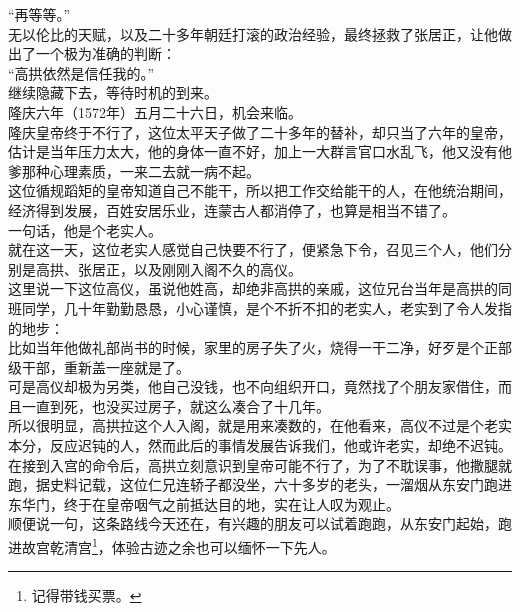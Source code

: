 \begin{multicols}{\theparacolNo}
“再等等。”\\

无以伦比的天赋，以及二十多年朝廷打滚的政治经验，最终拯救了张居正，让他做出了一个极为准确的判断：\\

“高拱依然是信任我的。”\\

继续隐藏下去，等待时机的到来。\\

隆庆六年（1572年）五月二十六日，机会来临。\\

隆庆皇帝终于不行了，这位太平天子做了二十多年的替补，却只当了六年的皇帝，估计是当年压力太大，他的身体一直不好，加上一大群言官口水乱飞，他又没有他爹那种心理素质，一来二去就一病不起。\\

这位循规蹈矩的皇帝知道自己不能干，所以把工作交给能干的人，在他统治期间，经济得到发展，百姓安居乐业，连蒙古人都消停了，也算是相当不错了。\\

一句话，他是个老实人。\\

就在这一天，这位老实人感觉自己快要不行了，便紧急下令，召见三个人，他们分别是高拱、张居正，以及刚刚入阁不久的高仪。\\

这里说一下这位高仪，虽说他姓高，却绝非高拱的亲戚，这位兄台当年是高拱的同班同学，几十年勤勤恳恳，小心谨慎，是个不折不扣的老实人，老实到了令人发指的地步：\\

比如当年他做礼部尚书的时候，家里的房子失了火，烧得一干二净，好歹是个正部级干部，重新盖一座就是了。\\

可是高仪却极为另类，他自己没钱，也不向组织开口，竟然找了个朋友家借住，而且一直到死，也没买过房子，就这么凑合了十几年。\\

所以很明显，高拱拉这个人入阁，就是用来凑数的，在他看来，高仪不过是个老实本分，反应迟钝的人，然而此后的事情发展告诉我们，他或许老实，却绝不迟钝。\\

在接到入宫的命令后，高拱立刻意识到皇帝可能不行了，为了不耽误事，他撒腿就跑，据史料记载，这位仁兄连轿子都没坐，六十多岁的老头，一溜烟从东安门跑进东华门，终于在皇帝咽气之前抵达目的地，实在让人叹为观止。\\

顺便说一句，这条路线今天还在，有兴趣的朋友可以试着跑跑，从东安门起始，跑进故宫乾清宫\footnote{记得带钱买票。}，体验古迹之余也可以缅怀一下先人。\\


\end{multicols}
